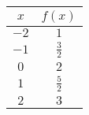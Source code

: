 \begin{tabular}{cc} \toprule
$x$  & $f(x)$        \\\midrule
$-2$ & $1$           \\[6pt]
$-1$ & $\frac{3}{2}$ \\[6pt]
$0$  & $2$           \\[6pt]
$1$  & $\frac{5}{2}$ \\[6pt]
$2$  & $3$           \\\bottomrule
\end{tabular}
